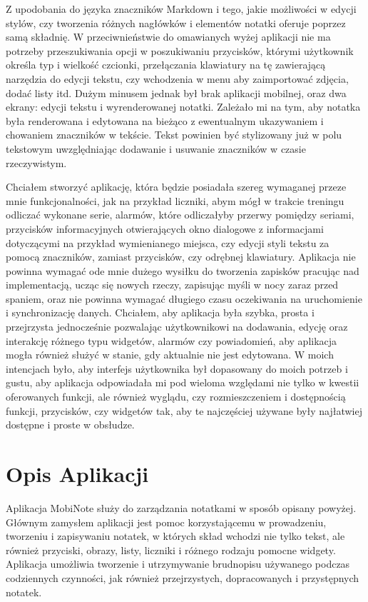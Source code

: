 \documentclass[shortabstract]{iithesis}
\begin{document}
Z upodobania do języka znaczników Markdown i tego, jakie możliwości w edycji stylów, czy tworzenia różnych nagłówków i elementów notatki oferuje poprzez samą składnię. W przeciwnieństwie do omawianych wyżej aplikacji nie ma potrzeby przeszukiwania opcji w poszukiwaniu przycisków, którymi użytkownik określa typ i wielkość czcionki, przełączania klawiatury na tę zawierającą narzędzia do edycji tekstu, czy wchodzenia w menu aby zaimportować zdjęcia, dodać listy itd. Dużym minusem jednak był brak aplikacji mobilnej, oraz dwa ekrany: edycji tekstu i wyrenderowanej notatki. Zależało mi na tym, aby notatka była renderowana i edytowana na bieżąco z ewentualnym ukazywaniem i chowaniem znaczników w tekście. Tekst powinien być stylizowany już w polu tekstowym uwzględniając dodawanie i usuwanie znaczników w czasie rzeczywistym.

Chciałem stworzyć aplikację, która będzie posiadała szereg wymaganej przeze mnie funkcjonalności, jak na przykład liczniki, abym mógł w trakcie treningu odliczać wykonane serie, alarmów, które odliczałyby przerwy pomiędzy seriami, przycisków informacyjnych otwierających okno dialogowe z informacjami dotyczącymi na przykład wymienianego miejsca, czy edycji styli tekstu za pomocą znaczników, zamiast przycisków, czy odrębnej klawiatury. Aplikacja nie powinna wymagać ode mnie dużego wysiłku do tworzenia zapisków pracując nad implementacją, ucząc się nowych rzeczy, zapisując myśli w nocy zaraz przed spaniem, oraz nie powinna wymagać długiego czasu oczekiwania na uruchomienie i synchronizację danych. Chciałem, aby aplikacja była szybka, prosta i przejrzysta jednocześnie pozwalając użytkownikowi na dodawania, edycję oraz interakcję różnego typu widgetów, alarmów czy powiadomień, aby aplikacja mogła również służyć w stanie, gdy aktualnie nie jest edytowana. W moich intencjach było, aby interfejs użytkownika był dopasowany do moich potrzeb i gustu, aby aplikacja odpowiadała mi pod wieloma względami nie tylko w kwestii oferowanych funkcji, ale również wyglądu, czy rozmieszczeniem i dostępnością funkcji, przycisków, czy widgetów tak, aby te najczęściej używane były najłatwiej dostępne i proste w obsłudze.

\section{Opis Aplikacji}

Aplikacja MobiNote służy do zarządzania notatkami w sposób opisany powyżej.
Głównym zamysłem aplikacji jest pomoc korzystającemu w prowadzeniu, tworzeniu i zapisywaniu notatek, w których skład wchodzi nie tylko tekst, ale również przyciski, obrazy, listy, liczniki i różnego rodzaju pomocne widgety.
Aplikacja umożliwia tworzenie i utrzymywanie brudnopisu używanego podczas codziennych czynności, jak również przejrzystych, dopracowanych i przystępnych  notatek.
\end{document}
